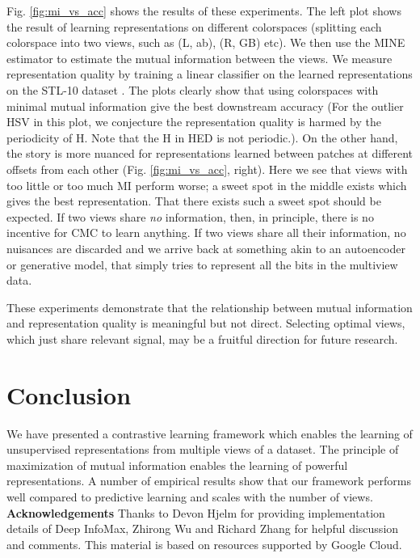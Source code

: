 \documentclass[10pt,twocolumn,letterpaper]{article}
\begin{document}
Fig. \ref{fig:mi_vs_acc} shows the results of these experiments. The left plot shows the result of learning representations on different colorspaces (splitting each colorspace into two views, such as (L, ab), (R, GB) etc). We then use the MINE estimator \cite{belghazi2018mine} to estimate the mutual information between the views. We measure representation quality by training a linear classifier on the learned representations on the STL-10 dataset \cite{coates2011analysis}. The plots clearly show that using colorspaces with minimal mutual information give the best downstream accuracy (For the outlier HSV in this plot, we conjecture the representation quality is harmed by the periodicity of H. Note that the H in HED is not periodic.). On the other hand, the story is more nuanced for representations learned between patches at different offsets from each other (Fig. \ref{fig:mi_vs_acc}, right). Here we see that views with too little or too much MI perform worse; a sweet spot in the middle exists which gives the best representation. That there exists such a sweet spot should be expected. If two views share \emph{no} information, then, in principle, there is no incentive for CMC to learn anything. If two views share all their information, no nuisances are discarded and we arrive back at something akin to an autoencoder or generative model, that simply tries to represent all the bits in the multiview data.

These experiments demonstrate that the relationship between mutual information and representation quality is meaningful but not direct. Selecting optimal views, which just share relevant signal, may be a fruitful direction for future research.  \section{Conclusion}
We have presented a contrastive learning framework which enables the learning of unsupervised representations from multiple views of a dataset. The principle of maximization of mutual information enables the learning of powerful representations. A number of empirical results show that our framework performs well compared to predictive learning and scales with the number of views.  
\vspace{10pt}
\noindent \textbf{Acknowledgements} Thanks to Devon Hjelm for providing implementation details of Deep InfoMax, Zhirong Wu and Richard Zhang for helpful discussion and comments. This material is based on resources supported by Google Cloud. 
\end{document}
